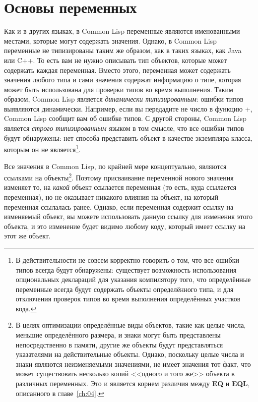 \section{Основы переменных}

Как и в других языках, в Common Lisp переменные являются именованными местами, которые
могут содержать значения. Однако, в Common Lisp переменные не типизированы таким же
образом, как в таких языках, как Java или C++. То есть вам не нужно описывать тип
объектов, которые может содержать каждая переменная. Вместо этого, переменная может
содержать значения любого типа и сами значения содержат информацию о типе, которая может
быть использована для проверки типов во время выполнения. Таким образом, Common Lisp
является \textit{динамически типизированным}: ошибки типов выявляются
динамически. Например, если вы передадите не число в функцию +, Common Lisp сообщит вам об
ошибке типов. С другой стороны, Common Lisp является \textit{строго типизированным} языком
в том смысле, что все ошибки типов будут обнаружены: нет способа представить объект в
качестве экземпляра класса, которым он не является\footnote{В действительности не совсем
  корректно говорить о том, что все ошибки типов всегда будут обнаружены: существует
  возможность использования опциональных деклараций для указания компилятору того, что
  определённые переменные всегда будут содержать объекты определённого типа, и для
  отключения проверок типов во время выполнения определённых участков кода.}.

Все значения в Common Lisp, по крайней мере концептуально, являются ссылками на
объекты\footnote{В целях оптимизации определённые виды объектов, такие как целые числа,
  меньшие определённого размера, и знаки могут быть представлены непосредственно в памяти,
  другие же объекты будут представляться указателями на действительные объекты. Однако,
  поскольку целые числа и знаки являются неизменяемыми значениями, не имеет значения тот
  факт, что может существовать несколько копий <<одного и того же>> объекта в различных
  переменных. Это и является корнем различия между \textbf{EQ} и \textbf{EQL}, описанного
  в главе~\ref{ch:04}.}. Поэтому присваивание переменной нового значения изменяет то, на
  \textit{какой} объект ссылается переменная (то есть, куда ссылается переменная), но не
  оказывает никакого влияния на объект, на который переменная ссылалась ранее. Однако,
  если переменная содержит ссылку на изменяемый объект, вы можете использовать данную
  ссылку для изменения этого объекта, и это изменение будет видимо любому коду, который
  имеет ссылку на этот же объект.

